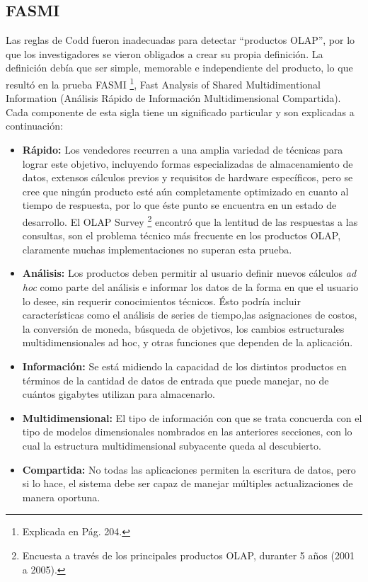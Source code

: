 \documentclass[a4paper,11pt]{article}
\begin{document}
    
    \subsection{FASMI}
    
    Las reglas de Codd fueron inadecuadas para detectar ``productos OLAP'', por lo que los investigadores se vieron obligados a crear su propia
    definición. La definición debía que ser simple, memorable e independiente del producto, lo que resultó en la prueba FASMI \footnote{Explicada en
    \cite{nagabhushana} Pág. 204.}, Fast Analysis of Shared Multidimentional Information (Análisis Rápido de Información 
    Multidimensional Compartida). Cada componente de esta sigla tiene un significado particular y son explicadas a continuación:
    
    \begin{itemize}
      \item \textbf{Rápido:} Los vendedores recurren a una amplia variedad de técnicas para lograr este objetivo, incluyendo formas especializadas de
      almacenamiento de datos, extensos cálculos previos y requisitos de hardware específicos, pero se cree que ningún producto esté aún completamente
      optimizado en cuanto al tiempo de respuesta, por lo que éste punto se encuentra en un estado de desarrollo.
      El OLAP Survey \footnote{Encuesta a través de los principales productos OLAP, duranter 5 años (2001 a 2005).} encontró
      que la lentitud de las respuestas a las consultas, son el problema técnico más frecuente en los productos OLAP, claramente muchas implementaciones
      no superan esta prueba.
      \item \textbf{Análisis:} Los productos deben permitir al usuario definir nuevos cálculos \textit{ad hoc} como parte del análisis e informar los datos de la
      forma en que el usuario lo desee, sin requerir conocimientos técnicos. Ésto podría incluir características como el análisis de series de tiempo,las
      asignaciones de costos, la conversión de moneda, búsqueda de objetivos, los cambios estructurales multidimensionales ad hoc, y otras funciones que
      dependen de la aplicación.
      \item \textbf{Información:} Se está midiendo la capacidad de los distintos productos en términos de la cantidad de datos de entrada que puede manejar,
      no de cuántos gigabytes utilizan para almacenarlo.
      \item \textbf{Multidimensional:} El tipo de información con que se trata concuerda con el tipo de modelos dimensionales nombrados en las anteriores
      secciones, con lo cual la estructura multidimensional subyacente queda al descubierto.
      \item \textbf{Compartida:} No todas las aplicaciones permiten la escritura de datos, pero si lo hace, el sistema debe ser capaz de manejar múltiples
      actualizaciones de manera oportuna.
    \end{itemize}
     
\end{document}
